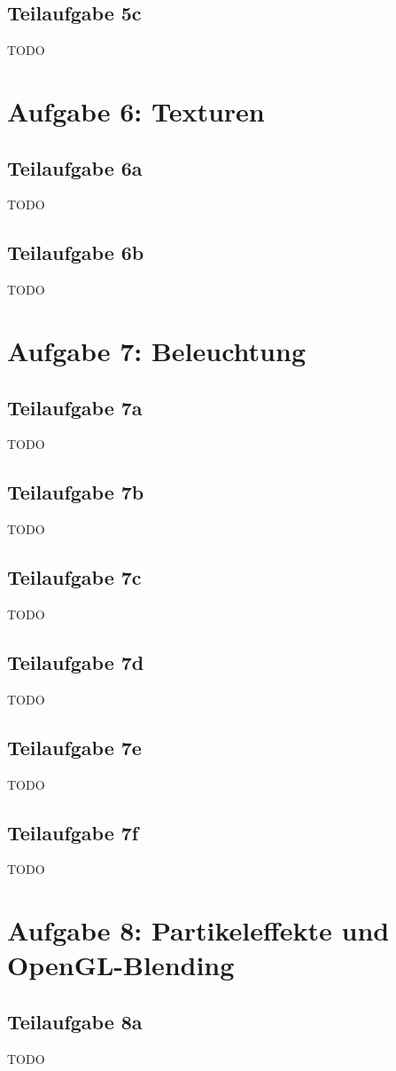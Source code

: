 \documentclass[a4paper]{scrartcl}
\begin{document}
\subsection*{Teilaufgabe 5c}
TODO

\section*{Aufgabe 6: Texturen}
\subsection*{Teilaufgabe 6a}
TODO
\subsection*{Teilaufgabe 6b}
TODO

\section*{Aufgabe 7: Beleuchtung}
\subsection*{Teilaufgabe 7a}
TODO
\subsection*{Teilaufgabe 7b}
TODO
\subsection*{Teilaufgabe 7c}
TODO
\subsection*{Teilaufgabe 7d}
TODO
\subsection*{Teilaufgabe 7e}
TODO
\subsection*{Teilaufgabe 7f}
TODO

\section*{Aufgabe 8: Partikeleffekte und OpenGL-Blending}
\subsection*{Teilaufgabe 8a}
TODO
\end{document}
